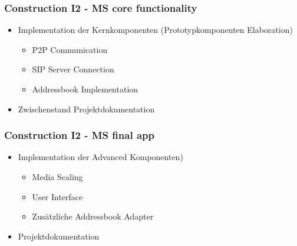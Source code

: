 		\subsubsection{Construction I2 - MS core functionality}
			\begin{itemize}
				\item Implementation der Kernkomponenten (Prototypkomponenten Elaboration)
					\begin{itemize}
						\item P2P Communication
						\item SIP Server Connection
						\item Addressbook Implementation
					\end{itemize}
				\item Zwischenstand Projektdokumentation
			\end{itemize}
			
		\subsubsection{Construction I2 - MS final app}
			\begin{itemize}
				\item Implementation der Advanced Komponenten)
					\begin{itemize}
						\item Media Scaling
						\item User Interface
						\item Zusätzliche Addressbook Adapter
					\end{itemize}
				\item Projektdokumentation
			\end{itemize}
	

